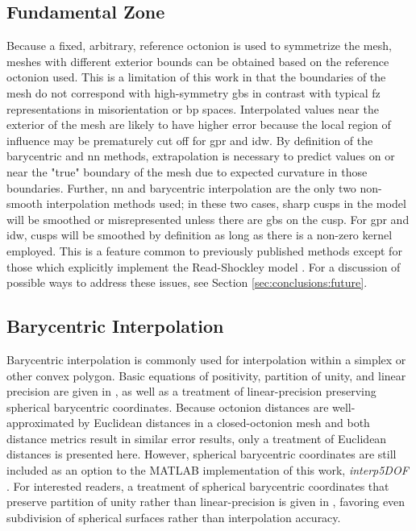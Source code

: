 \documentclass[preprint,12pt]{elsarticle}
\begin{document}
\subsection{Fundamental Zone}
Because a fixed, arbitrary, reference octonion is used to symmetrize the mesh, meshes with different exterior bounds can be obtained based on the reference octonion used. This is a limitation of this work in that the boundaries of the mesh do not correspond with high-symmetry \glspl{gb} in contrast with typical \gls{fz} representations in misorientation or \gls{bp} \cite{patalaSymmetriesRepresentationGrain2013,homerGrainBoundaryPlane2015} spaces. Interpolated values near the exterior of the mesh are likely to have higher error because the local region of influence may be prematurely cut off for \gls{gpr} and \gls{idw}. By definition of the barycentric and \gls{nn} methods, extrapolation is necessary to predict values on or near the "true" boundary of the mesh due to expected curvature in those boundaries. Further, \gls{nn} and barycentric interpolation are the only two non-smooth interpolation methods used; in these two cases, sharp cusps in the model will be smoothed or misrepresented unless there are \glspl{gb} on the cusp. For \gls{gpr} and \gls{idw}, cusps will be smoothed by definition as long as there is a non-zero kernel employed. This is a feature common to previously published methods \cite{liRelativeGrainBoundary2009,shenDeterminingGrainBoundary2019,chesserLearningGrainBoundary2020} except for those \cite{bulatovGrainBoundaryEnergy2014,shekhawatGeneralizedReadShockley2016} which explicitly implement the Read-Shockley model \cite{readDislocationModelsCrystal1950}. For a discussion of possible ways to address these issues, see Section \ref{sec:conclusions:future}.


\subsection{Barycentric Interpolation} \label{sec:methods:bary}

Barycentric interpolation is commonly used for interpolation within a simplex or other convex polygon. Basic equations of positivity, partition of unity, and linear precision are given in \cite{langerSphericalBarycentricCoordinates2006}, as well as a treatment of linear-precision preserving spherical barycentric coordinates. Because octonion distances are well-approximated by Euclidean distances in a closed-octonion mesh and both distance metrics result in similar error results, only a treatment of Euclidean distances is presented here. However, spherical barycentric coordinates are still included as an option to the MATLAB implementation of this work, \textit{interp5DOF} \cite{bairdFiveDegreeofFreedom5DOF2020}. For interested readers, a treatment of spherical barycentric coordinates that preserve partition of unity rather than linear-precision is given in \cite{leiNewCoordinateSystem2020}, favoring even subdivision of spherical surfaces rather than interpolation accuracy.
\end{document}
